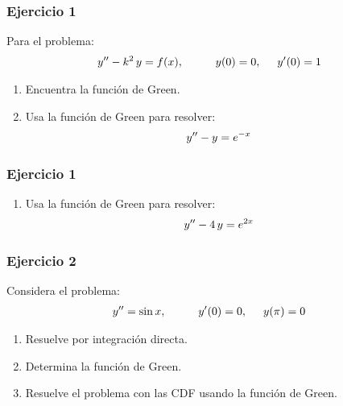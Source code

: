 \documentclass[12pt]{beamer}
\begin{document}
\begin{frame}
\frametitle{Ejercicio 1}
Para el problema:
\begin{align*}
    {y}^{\prime \prime} - k^{2} \, y = f (x), \hspace{1cm} y (0) = 0, \hspace{0.5cm} {y}^{\prime} (0) = 1
\end{align*}
\begin{enumerate}
\item Encuentra la función de Green.
\item Usa la función de Green para resolver:
\begin{align*}
    {y}^{\prime \prime} - y = e^{-x}
\end{align*}
\seti
\end{enumerate}
\end{frame}
\begin{frame}
\frametitle{Ejercicio 1}
\begin{enumerate}
\conti
\item Usa la función de Green para resolver:
\begin{align*}
    {y}^{\prime \prime} - 4 \, y = e^{2x}
\end{align*}
\end{enumerate}
\end{frame}
\begin{frame}
\frametitle{Ejercicio 2}
Considera el problema:
\begin{align*}
    {y}^{\prime \prime} = \sin x, \hspace{1cm} {y}^{\prime} (0) = 0, \hspace{0.5cm} y (\pi) = 0
\end{align*}
\begin{enumerate}[<+->]
\item Resuelve por integración directa.
\item Determina la función de Green.
\item Resuelve el problema con las CDF usando la función de Green.
\end{enumerate}
\end{frame}
\end{document}
